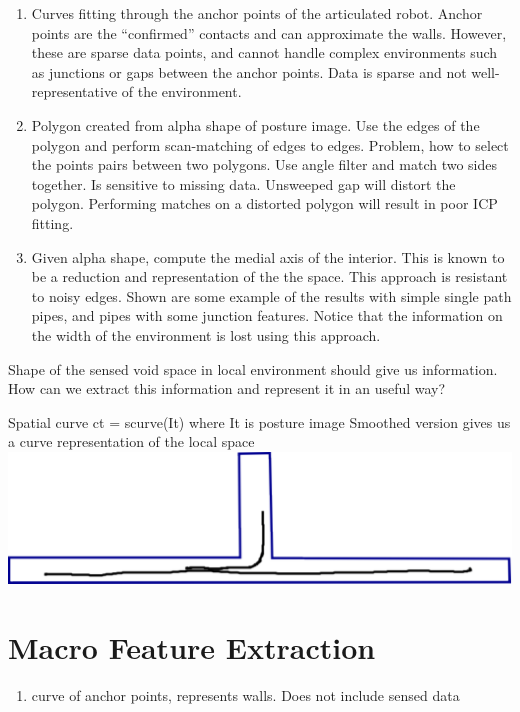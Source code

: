 \begin{enumerate}
\item Curves fitting through the anchor points of the articulated robot. Anchor points are the “confirmed” contacts and can approximate the walls. However, these are sparse data points, and cannot handle complex environments such as junctions or gaps between the anchor points. Data is sparse and not well-representative of the environment.

\item Polygon created from alpha shape of posture image. Use the edges of the polygon and perform scan-matching of edges to edges. Problem, how to select the points pairs between two polygons. Use angle filter and match two sides together. Is sensitive to missing data. Unsweeped gap will distort the polygon. Performing matches on a distorted polygon will result in poor ICP fitting.

\item Given alpha shape, compute the medial axis of the interior. This is known to be a reduction and representation of the the space. This approach is resistant to noisy edges. Shown are some example of the results with simple single path pipes, and pipes with some junction features. Notice that the information on the width of the environment is lost using this approach. 

\end{enumerate}

Shape of the sensed void space in local environment should give us information.
How can we extract this information and represent it in an useful way?

Spatial curve ct = scurve(It) where It is posture image
Smoothed version gives us a curve representation of the local space
\includegraphics[keepaspectratio,width=\textwidth,height=0.75\textheight]{PastedGraphic.pdf}


\section{Macro Feature Extraction}
\label{macrofeatureextraction}

\begin{enumerate}
\item curve of anchor points, represents walls. Does not include sensed data

\end{enumerate}

